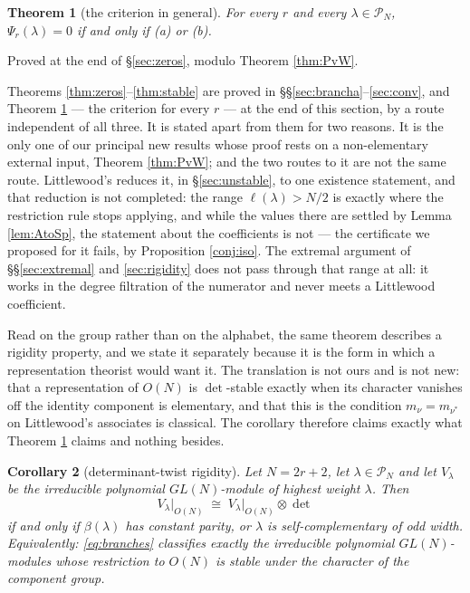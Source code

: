 \documentclass[11pt,reqno]{amsart}
\theoremstyle{plain}
\newtheorem{theorem}{Theorem}[section]
\newtheorem{corollary}[theorem]{Corollary}
\theoremstyle{definition}
\newcommand{\PP}{\mathcal{P}}
\begin{document}
\begin{theorem}[the criterion in general]\label{conj:crit}
For every $r$ and every $\lambda\in\PP_N$, $\Psi_r(\lambda)=0$ if and only if {\rm(a)} or
{\rm(b)}.
\end{theorem}

\noindent Proved at the end of \S\ref{sec:zeros}, modulo Theorem \ref{thm:PvW}.

Theorems \ref{thm:zeros}--\ref{thm:stable} are proved in \S\S\ref{sec:brancha}--\ref{sec:conv},
and Theorem \ref{conj:crit} --- the criterion for every $r$ --- at the end of this section, by a
route independent of all three. It is stated apart from them for two reasons. It is the only one of
our principal new results whose proof rests on a non-elementary external input, Theorem
\ref{thm:PvW}; and the two routes to it are not the same route. Littlewood's reduces it, in \S\ref{sec:unstable}, to one existence
statement, and that reduction is not completed: the range $\ell(\lambda)>N/2$ is exactly where the
restriction rule stops applying, and while the values there are settled by Lemma
\ref{lem:AtoSp}, the statement about the coefficients is not --- the certificate we proposed for
it fails, by Proposition \ref{conj:iso}. The extremal argument of \S\S\ref{sec:extremal} and
\ref{sec:rigidity} does not pass through that range at all: it works in the degree filtration of
the numerator and never meets a Littlewood coefficient.

Read on the group rather than on the alphabet, the same theorem describes a rigidity property, and we
state it separately because it is the form in which a representation theorist would want it. The
translation is not ours and is not new: that a representation of $O(N)$ is $\det$-stable exactly when
its character vanishes off the identity component is elementary, and that this is the condition
$m_\nu=m_{\nu^{*}}$ on Littlewood's associates \cite{Lit50} is classical. The corollary therefore
claims exactly what Theorem \ref{conj:crit} claims and nothing besides.

\begin{corollary}[determinant-twist rigidity]\label{cor:dettwist}
Let $N=2r+2$, let $\lambda\in\PP_N$ and let $V_\lambda$ be the irreducible polynomial $GL(N)$-module
of highest weight $\lambda$. Then
\[
V_\lambda\big|_{O(N)}\;\cong\;V_\lambda\big|_{O(N)}\otimes\det
\]
if and only if $\beta(\lambda)$ has constant parity, or $\lambda$ is self-complementary of odd
width. Equivalently: \eqref{eq:branches} classifies exactly the irreducible polynomial
$GL(N)$-modules whose restriction to $O(N)$ is stable under the character of the component group.
\end{corollary}
\end{document}
